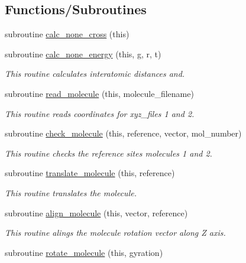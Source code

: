 \subsection*{Functions/\+Subroutines}
\begin{DoxyCompactItemize}
\item 
subroutine \hyperlink{namespacemod__read__molecules_a5e6a958bafd00dfe5c9279092970ae47}{calc\+\_\+none\+\_\+cross} (this)
\item 
subroutine \hyperlink{namespacemod__read__molecules_a137ae89987a14c217f0bcfba8ca493ec}{calc\+\_\+none\+\_\+energy} (this, g, r, t)
\begin{DoxyCompactList}\small\item\em This routine calculates interatomic distances and. \end{DoxyCompactList}\item 
subroutine \hyperlink{namespacemod__read__molecules_a61dd5623986abe13f76dfed8a5ad1e35}{read\+\_\+molecule} (this, molecule\+\_\+filename)
\begin{DoxyCompactList}\small\item\em This routine reads coordinates for xyz\+\_\+files 1 and 2. \end{DoxyCompactList}\item 
subroutine \hyperlink{namespacemod__read__molecules_aae2115ec246e295817cd546bda666e23}{check\+\_\+molecule} (this, reference, vector, mol\+\_\+number)
\begin{DoxyCompactList}\small\item\em This routine checks the reference sites molecules 1 and 2. \end{DoxyCompactList}\item 
subroutine \hyperlink{namespacemod__read__molecules_a516f16861094339983ebcd9af3fedbaa}{translate\+\_\+molecule} (this, reference)
\begin{DoxyCompactList}\small\item\em This routine translates the molecule. \end{DoxyCompactList}\item 
subroutine \hyperlink{namespacemod__read__molecules_ae228ade0f7ea15cdb9d186848ae4eae7}{align\+\_\+molecule} (this, vector, reference)
\begin{DoxyCompactList}\small\item\em This routine alings the molecule rotation vector along Z axis. \end{DoxyCompactList}\item 
subroutine \hyperlink{namespacemod__read__molecules_a3b4923002ba2fa7a6438df2afa80d406}{rotate\+\_\+molecule} (this, gyration)

\end{DoxyCompactItemize}
